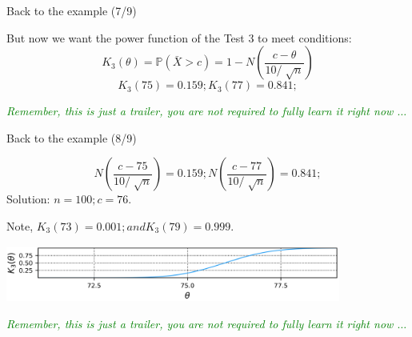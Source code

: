 \documentclass{beamer}
\begin{document}
\begin{frame}
{\centerline{Back to the example (7/9)}}


But now we want the power function of the Test 3 to meet conditions: 
$$K_{3}(\theta) = \mathbb{P}(\bar{X}>c) = 1 - N\left(\frac{c-\theta}{10/\sqrt[]{n}}\right)$$
$$K_{3}(75) = 0.159; K_{3}(77) = 0.841; $$

\vspace*{1cm}
\begin{center}
\textcolor{green}{\textit{Remember, this is just a trailer, you are not required to fully learn it right now $\ldots{}$}}
\end{center}


\end{frame}




\begin{frame}
{\centerline{Back to the example (8/9)}}

$$N\left(\frac{c-75}{10/\sqrt[]{n}}\right) = 0.159; N\left(\frac{c-77}{10/\sqrt[]{n}}\right) = 0.841; $$
Solution: $n=100; c=76.$ 

Note, $K_3(73) = 0.001; and K_3(79) = 0.999$.

\begin{center}  
\includegraphics[width=11cm]{A2022.IDSEPC.SperimentazioneDeduzione/k3.png}
\end{center}

\vspace*{0.5cm}
\begin{center}
\textcolor{green}{\textit{Remember, this is just a trailer, you are not required to fully learn it right now $\ldots{}$}}
\end{center}

\end{frame}



\end{document}
